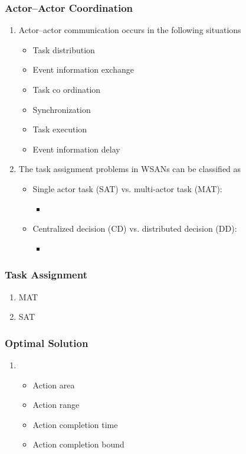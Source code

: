 \documentclass[11pt]{class}
\begin{document}
										\begin{frame}
											\frametitle{Actor–Actor Coordination}
											\begin{enumerate}
												\item Actor–actor communication occurs in the following situations
											\begin{itemize}
												\item Task distribution
												\item Event information exchange
												\item Task co ordination
												\item Synchronization
												\item Task execution
												\item Event information delay
											\end{itemize}
											\item The task assignment problems in WSANs can be classified as
											\begin{itemize}
												\item Single actor task (SAT) vs. multi-actor task (MAT):
												\begin{itemize}
													\item 
												\end{itemize}
												\item Centralized decision (CD) vs. distributed decision (DD):
												\begin{itemize}
													\item 
												\end{itemize}
											\end{itemize}
											\end{enumerate}
										\end{frame}
										
										\begin{frame}
											\frametitle{Task Assignment}
											\begin{enumerate}
												\item MAT
												\item SAT
											\end{enumerate}
										\end{frame}
										\begin{frame}
											\frametitle{Optimal Solution}
											\begin{enumerate}
												\item 
												\begin{itemize}
													\item Action area
													\item Action range
													\item Action completion time
													\item Action completion bound 
												\end{itemize}
											
											\end{enumerate}
										\end{frame}
										
\end{document}
